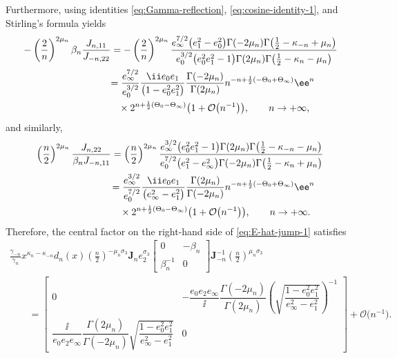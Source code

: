 Furthermore, using identities \eqref{eq:Gamma-reflection}, \eqref{eq:cosine-identity-1}, and Stirling's formula yields
\begin{align*}
 & -\left(\frac{2}{n}\right)^{2\mu_n}\beta_n\frac{J_{n,11}}{J_{-n,22}} = -\left(\frac{2}{n}\right)^{2\mu_n} \frac{e_\infty^{7/2} \big(e_1^2-e_0^2\big) \Gamma (-2 \mu_n ) \Gamma \big(\frac{1}{2}-\kappa_{-n}+\mu_n \big)}{e_0^{3/2} \big(e_0^2 e_1^2-1\big) \Gamma (2 \mu_n ) \Gamma \big(\frac{1}{2}-\kappa_{n}-\mu_n \big)} \\
 &\hphantom{-\left(\frac{2}{n}\right)^{2\mu_n}\beta_n\frac{J_{n,11}}{J_{-n,22}}}{}
 = \frac{e_\infty^{7/2}}{e_0^{3/2}} \dfrac{\ii e_0e_1}{\big(1- e_0^2 e_1^2\big) } \dfrac{\Gamma (-2 \mu_n ) }{ \Gamma (2 \mu_n ) } n^{-n+\frac{1}{2}(-\Theta_0+\Theta_\infty)}\ee^n \\
 &\hphantom{-\left(\frac{2}{n}\right)^{2\mu_n}\beta_n\frac{J_{n,11}}{J_{-n,22}}=}{}
 \times 2^{n + \frac{1}{2}(\Theta_0-\Theta_\infty)}\big(1+\mathcal{O}\big(n^{-1}\big)\big),\qquad n\to+\infty,
\end{align*}
and similarly,
\begin{align*}
&\left(\frac{n}{2}\right)^{2\mu_n}\frac{J_{n,22}}{\beta_nJ_{-n,11}} = \left(\frac{n}{2}\right)^{2\mu_n} \frac{e_\infty^{3/2}\big(e_0^2 e_1^2-1\big) \Gamma (2 \mu_n ) \Gamma \big(\frac{1}{2}-\kappa_{-n}-\mu_n \big)}{e_0^{7/2} \big(e_1^2-e_\infty^2\big) \Gamma (-2 \mu_n ) \Gamma \big(\frac{1}{2}-\kappa_n+\mu_n \big)}\\
&\hphantom{\left(\frac{n}{2}\right)^{2\mu_n}\frac{J_{n,22}}{\beta_nJ_{-n,11}}}{}
= \frac{e_\infty^{3/2}}{e_0^{7/2}} \dfrac{\ii e_0e_1}{\big(e_\infty^2 - e_1^2\big)}\dfrac{ \Gamma (2 \mu_n ) }{ \Gamma (-2 \mu_n )}n^{-n+\frac{1}{2}(-\Theta_0+\Theta_\infty)}\ee^n \\
&\hphantom{\left(\frac{n}{2}\right)^{2\mu_n}\frac{J_{n,22}}{\beta_nJ_{-n,11}}=}{}
\times 2^{n + \frac{1}{2}(\Theta_0-\Theta_\infty)}\big(1+\mathcal{O}\big(n^{-1}\big)\big),\qquad n\to+\infty.
\end{align*}
Therefore, the central factor on the right-hand side of \eqref{eq:E-hat-jump-1} satisfies
\begin{gather*}
\frac{\gamma_{-n}}{\gamma_n}x^{\kappa_n-\kappa_{-n}}d_n(x)\left(\frac{n}{2}\right)^{-\mu_n\sigma_3}\mathbf{J}_ne_2^{\sigma_3}\begin{bmatrix}0 & -\beta_n\\\beta_n^{-1} & 0\end{bmatrix}\mathbf{J}_{-n}^{-1}\left(\frac{n}{2}\right)^{\mu_n\sigma_3}\\
\qquad = \begin{bmatrix} 0 & -\dfrac{e_0 e_2 e_\infty}{\ii}\dfrac{ \Gamma (-2 \mu_n )}{ \Gamma (2 \mu_n )} \left(\sqrt{\dfrac{1 - e_0^2 e_1^2}{e_\infty^2-e_1^2 } }\right)^{-1} \\
 \dfrac{ \ii }{e_0 e_2 e_\infty} \dfrac{\Gamma (2 \mu_n )}{ \Gamma (-2 \mu_n )} \sqrt{\dfrac{1 - e_0^2 e_1^2}{e_\infty^2-e_1^2 }} & 0
\end{bmatrix} + \mathcal{O}\big(n^{-1}\big).
\end{gather*}
